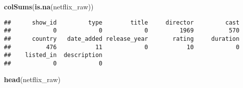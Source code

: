 \documentclass[]{article}
\newenvironment{Shaded}{\begin{snugshade}}{\end{snugshade}}
\newcommand{\KeywordTok}[1]{\textcolor[rgb]{0.13,0.29,0.53}{\textbf{#1}}}
\newcommand{\NormalTok}[1]{#1}
\begin{document}
\begin{Shaded}
\begin{Highlighting}[]
\KeywordTok{colSums}\NormalTok{(}\KeywordTok{is.na}\NormalTok{(netflix_raw))}
\end{Highlighting}
\end{Shaded}

\begin{verbatim}
##      show_id         type        title     director         cast 
##            0            0            0         1969          570 
##      country   date_added release_year       rating     duration 
##          476           11            0           10            0 
##    listed_in  description 
##            0            0
\end{verbatim}

\begin{Shaded}
\begin{Highlighting}[]
\KeywordTok{head}\NormalTok{(netflix_raw)}
\end{Highlighting}
\end{Shaded}
\end{document}
